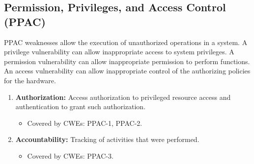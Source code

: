 \documentclass{article}
\begin{document}
\subsection{Permission, Privileges, and Access Control (PPAC)}
PPAC weaknesses allow the execution of unauthorized operations in a system. A privilege vulnerability can allow inappropriate access to system privileges. A permission vulnerability can allow inappropriate permission to perform functions. An access vulnerability can allow inappropriate control of the authorizing policies for the hardware.
\begin{enumerate}
    \item \textbf{Authorization:} Access authorization to privileged resource access and authentication to grant such authorization.
    \begin{itemize}
        \item Covered by CWEs: PPAC-1, PPAC-2.
    \end{itemize}
    
    \item \textbf{Accountability:} Tracking of activities that were performed.
    \begin{itemize}
        \item Covered by CWEs: PPAC-3.
    \end{itemize}
\end{enumerate}
\end{document}

